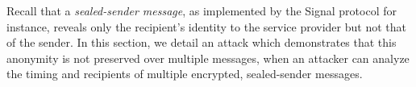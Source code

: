% 
% 










Recall that a \emph{sealed-sender message}, as implemented by the
Signal protocol for instance, reveals only the recipient's identity to the service provider but not that of the sender.
In this section, we detail an attack which demonstrates that this
anonymity is not preserved over multiple messages, when an attacker can
analyze the timing and recipients of multiple encrypted, sealed-sender
messages.

